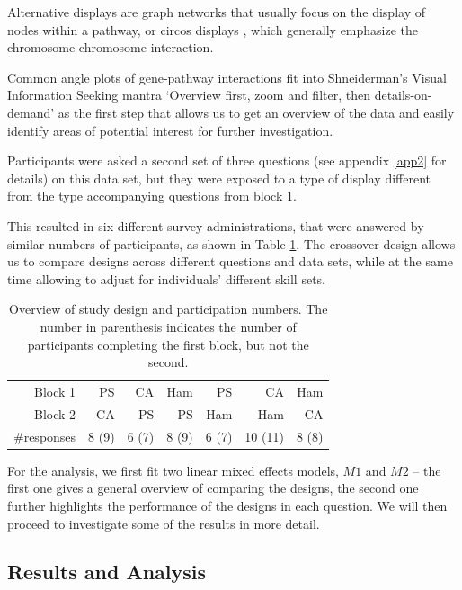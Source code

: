 Alternative displays are graph networks that usually focus on the display of nodes within a pathway, or circos displays \cite{k}, which generally emphasize the chromosome-chromosome interaction.


 Common angle plots of gene-pathway interactions fit into Shneiderman's  Visual Information Seeking mantra `Overview first, zoom and filter, then details-on-demand' \cite{shneiderman:96} as the first step that allows us to get an overview of the data and easily identify areas of potential interest for further investigation. 
  
 
 

 
Participants were asked a second set of three questions (see appendix \ref{app2} for details) on this data set, but they were exposed to a  type of display different from the type accompanying questions from block 1.
  
This resulted in six different survey administrations, that were answered by similar numbers of participants, as shown in Table \ref{tab:designs}. The crossover design allows us to compare designs across different questions and data sets, while at the same time allowing to adjust for individuals' different skill sets.

\begin{table}[htbp]
\centering
\begin{tabular}{rrrrrrr}
Block 1 & PS & CA & Ham & PS & CA & Ham \\ 
 Block 2 & CA & PS & PS & Ham & Ham & CA \\ \hline
\#responses &  8 (9) &  6 (7) &  8 (9) &  6 (7) & 10 (11) & 8 (8)\\ 
\end{tabular}
\caption{\label{tab:designs} Overview of study design and participation numbers. The number in parenthesis indicates the number of participants completing the first block, but not the second.}
\end{table}

For the analysis, we first fit two linear mixed effects models, $M1$ and $M2$ -- the first one gives a general overview of comparing the designs, the second one further highlights the performance of the designs in each question.
We will then proceed to investigate some of the results in more detail.





\subsection{Results and Analysis}\label{results}
